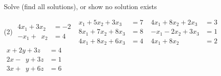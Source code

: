 \documentclass{ximera}
\begin{document}
\begin{exercise}
    Solve (find all solutions), or show no solution exists
    \begin{tasks}(2)
        \task
        $\begin{aligned}
         4x_1+3x_2 & = -2 \\
         -x_1+\phantom{3} x_2 & = 4
        \end{aligned}$
        \task
        $\begin{aligned}
          x_1+5x_2+3x_3 & = 7 \\
         8x_1+7x_2+8x_3 & = 8 \\
         4x_1+8x_2+6x_3 & = 4
        \end{aligned}$
        \task
        $\begin{aligned}
         4x_1+8x_2+2x_3 & = 3 \\
         -x_1-2x_2+3x_3 & = 1 \\
         4x_1+8x_2 \phantom{{}+3x_3} & = 2
        \end{aligned}$
        \task
        $\begin{aligned}
          x+2y+3z & = 4 \\
        2  x-\phantom{2} y+3z & = 1 \\
        3  x+\phantom{2} y+6z & = 6
        \end{aligned}$
    \end{tasks}
\end{exercise}
\end{document}
